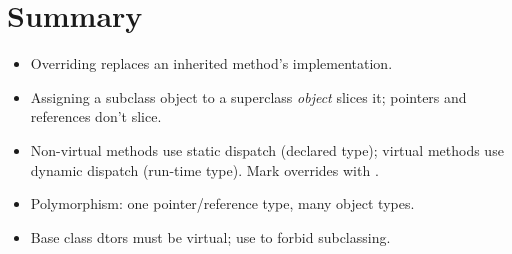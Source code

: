 \section*{Summary}
\begin{itemize}
  \item Overriding replaces an inherited method's implementation.
  \item Assigning a subclass object to a superclass \emph{object} slices it;
        pointers and references don't slice.
  \item Non-virtual methods use static dispatch (declared type); virtual methods
        use dynamic dispatch (run-time type). Mark overrides with
        .
  \item Polymorphism: one pointer/reference type, many object types.
  \item Base class dtors must be virtual; use  to forbid
        subclassing.
\end{itemize}
